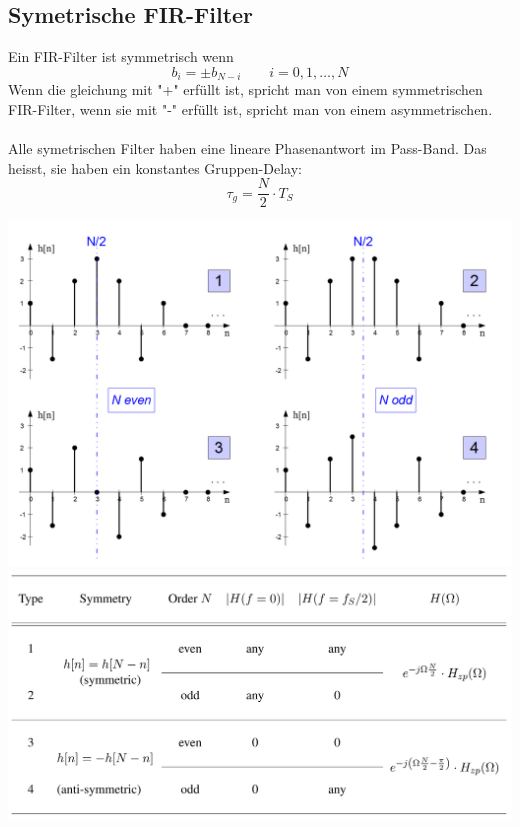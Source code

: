 \subsection{Symetrische FIR-Filter}
Ein FIR-Filter ist symmetrisch wenn
\[ b_i = \pm b_{N-i} \qquad i = 0,1,\ldots,N \]
Wenn die gleichung mit "+" erfüllt ist, spricht man von einem symmetrischen 
FIR-Filter, wenn sie mit "-" erfüllt ist, spricht man von einem asymmetrischen.\\
\\
Alle symetrischen Filter haben eine lineare Phasenantwort im Pass-Band. Das
heisst, sie haben ein konstantes Gruppen-Delay:
\[ \tau_g = \frac{N}{2} \cdot T_S \]

\begin{center}
	\includegraphics[scale=.7]{./images/fir_filter}
	\includegraphics[scale=.7]{./images/fir_table}
\end{center}

